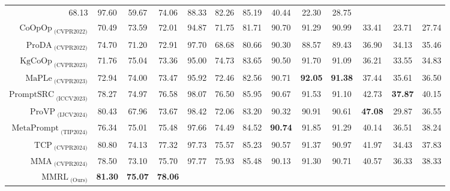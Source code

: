 \begin{table}[t]
{{\begin{tabular}{@{}r|ccc|ccc|ccc|ccc@{}}
      68.13 &
      97.60 &
      59.67 &
      74.06 &
      88.33 &
      82.26 &
      85.19 &
      40.44 &
      22.30 &
      28.75 \\
    $\text{CoOpOp}_{\text{ (CVPR2022)}}$ &
      70.49 &
      73.59 &
      72.01 &
      94.87 &
      71.75 &
      81.71 &
      90.70 &
      91.29 &
      90.99 &
      33.41 &
      23.71 &
      27.74 \\
    $\text{ProDA}_{\text{ (CVPR2022)}}$ &
      74.70 &
      71.20 &
      72.91 &
      97.70 &
      68.68 &
      80.66 &
      90.30 &
      88.57 &
      89.43 &
      36.90 &
      34.13 &
      35.46 \\
    $\text{KgCoOp}_{\text{ (CVPR2023)}}$ &
      71.76 &
      75.04 &
      73.36 &
      95.00 &
      74.73 &
      83.65 &
      90.50 &
      91.70 &
      91.09 &
      36.21 &
      33.55 &
      34.83 \\
    $\text{MaPLe}_{\text{ (CVPR2023)}}$ &
      72.94 &
      74.00 &
      73.47 &
      95.92 &
      72.46 &
      82.56 &
      90.71 &
      \textbf{92.05} &
      \textbf{91.38} &
      37.44 &
      35.61 &
      36.50 \\
    $\text{PromptSRC}_{\text{ (ICCV2023)}}$ &
      78.27 &
      74.97 &
      76.58 &
      98.07 &
      76.50 &
      85.95 &
      90.67 &
      91.53 &
      91.10 &
      42.73 &
      \textbf{37.87} &
      40.15 \\
    $\text{ProVP}_{\text{ (IJCV2024)}}$ &
      80.43 &
      67.96 &
      73.67 &
      98.42 &
      72.06 &
      83.20 &
      90.32 &
      90.91 &
      90.61 &
      \textbf{47.08} &
      29.87 &
      36.55 \\
    $\text{MetaPrompt}_{\text{ (TIP2024)}}$ &
      76.34 &
      75.01 &
      75.48 &
      97.66 &
      74.49 &
      84.52 &
      \textbf{90.74} &
      91.85 &
      91.29 &
      40.14 &
      36.51 &
      38.24 \\
    $\text{TCP}_{\text{ (CVPR2024)}}$ &
      80.80 &
      74.13 &
      77.32 &
      97.73 &
      75.57 &
      85.23 &
      90.57 &
      91.37 &
      90.97 &
      41.97 &
      34.43 &
      37.83 \\
    $\text{MMA}_{\text{ (CVPR2024)}}$ &
      78.50 &
      73.10 &
      75.70 &
      97.77 &
      75.93 &
      85.48 &
      90.13 &
      91.30 &
      90.71 &
      40.57 &
      36.33 &
      38.33 \\ \midrule
    $\text{MMRL}_{\text{ (Ours)}}$ &
      \textbf{81.30} &
      \textbf{75.07} &
      \textbf{78.06} &

\end{tabular}}}
\end{table}
